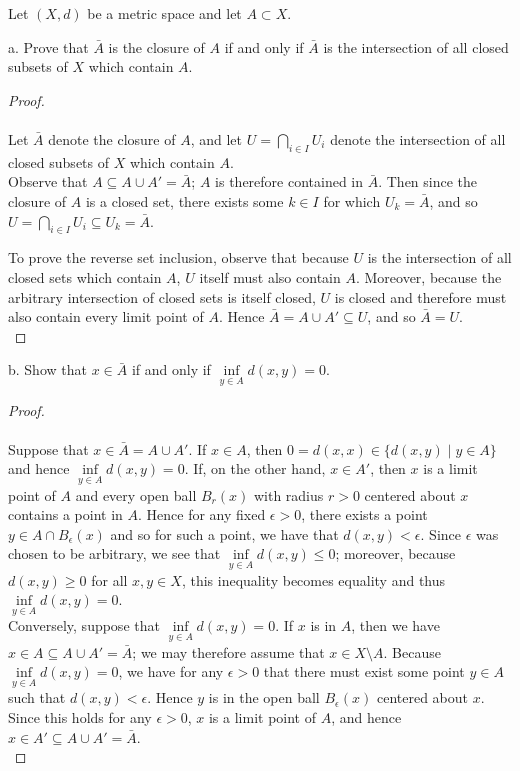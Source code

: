 Let $(X, d)$ be a metric space and let $A \subset X$.

a.  Prove that $\bar{A}$ is the closure of $A$ if and only if $\bar{A}$ is the intersection of all closed subsets of $X$
    which contain $A$.

\begin{proof}\ \\\\
    Let $\bar{A}$ denote the closure of $A$, and let $U = \bigcap\limits_{i \in I}{U_i}$ denote the intersection of all 
    closed subsets of $X$ which contain $A$.\ \\

    Observe that $A \subseteq A \cup A' = \bar{A}$; $A$ is therefore contained in $\bar{A}$. Then since the closure of
    $A$ is a closed set, there exists some $k \in I$ for which $U_k = \bar{A}$, and so 
    $U = \bigcap\limits_{i \in I}{U_i} \subseteq U_k = \bar{A}$.

    To prove the reverse set inclusion, observe that because $U$ is the intersection of all closed sets which contain 
    $A$, $U$ itself must also contain $A$. Moreover, because the arbitrary intersection of closed sets is itself closed,
    $U$ is closed and therefore must also contain every limit point of $A$. Hence $\bar{A} = A \cup A' \subseteq U$, and
    so $\bar{A} = U$.
    \ \\
 \end{proof}

\pagebreak

b.  Show that $x \in \bar{A}$ if and only if $\inf\limits_{y \in A}{d(x, y)} = 0$.

\begin{proof}\ \\\\
    Suppose that $x \in \bar {A} = A \cup A'$. If $x \in A$, then $0 = d(x, x) \in \{ d(x, y) \mid y \in A\}$ and hence
    $\inf\limits_{y \in A}{d(x, y)} = 0$. If, on the other hand, $x \in A'$, then $x$ is a limit point of $A$ and every
    open ball $B_r(x)$ with radius $r > 0$ centered about $x$ contains a point in $A$. Hence for any fixed 
    $\epsilon > 0$, there exists a point $y \in A \cap B_{\epsilon}(x)$ and so for such a point, we have that 
    $d(x, y) < \epsilon$.  Since $\epsilon$ was chosen to be arbitrary, we see that 
    $\inf\limits_{y \in A}{d(x, y)} \le 0$; moreover, because $d(x, y) \ge 0$ for all $x, y \in X$, this inequality 
    becomes equality and thus $\inf\limits_{y \in A}{d(x, y)} = 0$. \ \\

    Conversely, suppose that $\inf\limits_{y \in A}{d(x, y)} = 0$. If $x$ is in $A$, then we have 
    $x \in A \subseteq A \cup A' = \bar{A}$; we may therefore assume that $x \in X \setminus A$. Because 
    $\inf\limits_{y \in A}{d(x, y)} = 0$, we have for any $\epsilon > 0$ that there must exist some point $y \in A$ such
    that $d(x, y) < \epsilon$. Hence $y$ is in the open ball $B_{\epsilon}(x)$ centered about $x$. Since this holds for 
    any $\epsilon > 0$, $x$ is a limit point of $A$, and hence $x \in A' \subseteq A \cup A' = \bar{A}$.
    \ \\
\end{proof}

